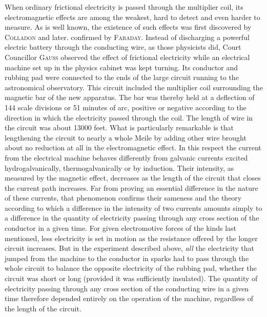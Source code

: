 When ordinary frictional electricity is passed through the multiplier coil, its electromagnetic effects are among the weakest, hard to detect and even harder to measure. As is well known, the
existence of such effects was first discovered by \textsc{Colladon} and later. confirmed by \textsc{Faraday}. Instead of discharging a powerful electric battery through the conducting wire, as those physicists did, Court Councillor \textsc{Gauss} observed the effect of frictional electricity while an electrical machine set up in the physics cabinet was kept turning. Its conductor and rubbing pad were connected to the ends of the large circuit running to the astronomical observatory. This circuit included the multiplier coil surrounding the magnetic bar of the new apparatus. The bar was thereby held at a deflection of 144 scale divisions or 51 minutes of arc, positive or negative according to the direction in which the electricity passed through the coil. The length of wire in the circuit was about 13000 feet. What is particularly remarkable is that lengthening the circuit to nearly a whole Meile by adding other wire brought about no reduction at all in the electromagnetic effect. In this respect the current from the electrical machine behaves differently from galvanic currents excited hydrogalvanically, thermogalvanically or by induction. Their intensity, as measured by the magnetic effect, decreases as the length of the circuit that closes the current path increases. Far from proving an essential difference in the nature of these currents, that phenomenon confirms their sameness and the theory according to which a difference in the intensity of two currents amounts simply to a difference in the quantity of electricity passing through any cross section of the conductor in a given time. For given electromotive forces of the kinds last mentioned, less electricity is set in motion as the resistance offered by the longer circuit increases. But in the experiment described above, \textit{all} the electricity that jumped from the machine to the conductor in sparks had to pass through the whole circuit to balance the opposite electricity of the rubbing pad, whether the circuit was short or long (provided it was sufficiently insulated). The quantity of electricity passing through any cross section of the conducting wire in a given time therefore depended entirely on the operation of the machine, regardless of the length of the circuit.

